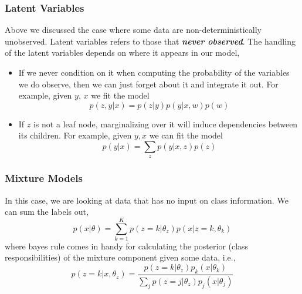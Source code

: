 \documentclass[11pt]{article}
\begin{document}
\subsubsection{Latent Variables}
Above we discussed the case where some data are non-deterministically unobserved. Latent variables refers to those that \textit{\textbf{never observed}}. The handling of the latent variables depends on where it appears in our model,
\begin{itemize}
    \item If we never condition on it when computing the probability of the variables we do observe, then we can just forget about it and integrate it out. For example, given $y$, $x$ we fit the model
        \begin{equation*}
            p(z, y | x)=p(z | y) p(y | x, w) p(w)
        \end{equation*}
    \item If $z$ is not a leaf node, marginalizing over it will induce dependencies between its children. For example, given $y, x$ we can fit the model 
        \begin{equation*}
            p(y | x)=\sum_{z} p(y | x, z) p(z)
        \end{equation*}
\end{itemize}

\subsubsection{Mixture Models}
In this case, we are looking at data that has no input on class information. We can sum the labels out,
\begin{equation*}
    p(x | \theta)=\sum_{k=1}^{K} p\left(z=k | \theta_{z}\right) p\left(x | z=k, \theta_{k}\right)
\end{equation*}
where bayes rule comes in handy for calculating the posterior (class responsibilities) of the mixture component given some data, i.e., 
\begin{equation*}
    p\left(z=k | x, \theta_{z}\right)=\frac{p\left(z=k | \theta_{z}\right) p_{k}\left(x | \theta_{k}\right)}{\sum_{j} p\left(z=j | \theta_{z}\right) p_{j}\left(x | \theta_{j}\right)}
\end{equation*} 
%
\end{document}
